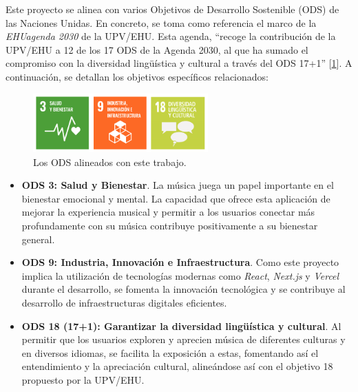 Este proyecto se alinea con varios Objetivos de Desarrollo Sostenible (ODS) de las Naciones Unidas. En concreto, se toma como referencia el marco de la \textit{EHUagenda 2030} de la UPV/EHU. Esta agenda, ``recoge la contribución de la UPV/EHU a 12 de los 17 ODS de la Agenda 2030, al que ha sumado el compromiso con la diversidad lingüística y cultural a través del ODS 17+1'' [\hyperref[ch:bib]{1}]. A continuación, se detallan los objetivos específicos relacionados:

\begin{figure}[h]
    \centering
    \includegraphics[width=0.6\textwidth]{figures/tres_ods_relacionadas.png}
    \caption{Los ODS alineados con este trabajo.}
\end{figure}

\begin{itemize}
    \item \textbf{ODS 3: Salud y Bienestar}. La música juega un papel importante en el bienestar emocional y mental. La capacidad que ofrece esta aplicación de mejorar la experiencia musical y permitir a los usuarios conectar más profundamente con su música contribuye positivamente a su bienestar general.
    \item \textbf{ODS 9: Industria, Innovación e Infraestructura}. Como este proyecto implica la utilización de tecnologías modernas como \textit{React}, \textit{Next.js} y \textit{Vercel} durante el desarrollo, se fomenta la innovación tecnológica y se contribuye al desarrollo de infraestructuras digitales eficientes.
    \item \textbf{ODS 18 (17+1): Garantizar la diversidad lingüística y cultural}. Al permitir que los usuarios exploren y aprecien música de diferentes culturas y en diversos idiomas, se facilita la exposición a estas, fomentando así el entendimiento y la apreciación cultural, alineándose así con el objetivo 18 propuesto por la UPV/EHU.
\end{itemize}